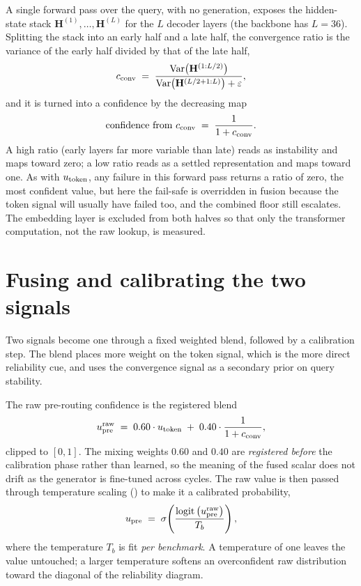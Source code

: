 \begin{precise}
A single forward pass over the query, with no generation, exposes the hidden-state
stack $\mathbf{H}^{(1)}, \dots, \mathbf{H}^{(L)}$ for the $L$ decoder layers (the
backbone has $L=36$). Splitting the stack into an early half and a late half, the
convergence ratio is the variance of the early half divided by that of the late
half,
\[
  c_{\text{conv}}
  \;=\;
  \frac{\operatorname{Var}\!\big(\mathbf{H}^{(1:L/2)}\big)}
       {\operatorname{Var}\!\big(\mathbf{H}^{(L/2+1:L)}\big) + \varepsilon},
\]
and it is turned into a confidence by the decreasing map
\[
  \text{confidence from } c_{\text{conv}} \;=\; \frac{1}{1 + c_{\text{conv}}}.
\]
A high ratio (early layers far more variable than late) reads as instability and
maps toward zero; a low ratio reads as a settled representation and maps toward
one. As with $u_{\text{token}}$, any failure in this forward pass returns a ratio of zero,
the most confident value, but here the fail-safe is overridden in fusion because
the token signal will usually have failed too, and the combined floor still
escalates. The embedding layer is excluded from both halves so that only the
transformer computation, not the raw lookup, is measured.
\end{precise}

\section{Fusing and calibrating the two signals}
\label{sec:upre-fusion}

Two signals become one through a fixed weighted blend, followed by a calibration
step. The blend places more weight on the token signal, which is the more direct
reliability cue, and uses the convergence signal as a secondary prior on query
stability.

\begin{precise}
The raw pre-routing confidence is the registered blend
\[
  u_{\text{pre}}^{\text{raw}}
  \;=\;
  0.60 \cdot u_{\text{token}} \;+\; 0.40 \cdot \frac{1}{1 + c_{\text{conv}}},
\]
clipped to $[0,1]$. The mixing weights $0.60$ and $0.40$ are \emph{registered
before} the calibration phase rather than learned, so the meaning of the fused
scalar does not drift as the generator is fine-tuned across cycles. The raw value
is then passed through temperature scaling () to make
it a calibrated probability,
\[
  u_{\text{pre}}
  \;=\;
  \sigma\!\left(\frac{\operatorname{logit}\big(u_{\text{pre}}^{\text{raw}}\big)}{T_b}\right),
\]
where the temperature $T_b$ is fit \emph{per benchmark}. A temperature of one
leaves the value untouched; a larger temperature softens an overconfident raw
distribution toward the diagonal of the reliability diagram.
\end{precise}

